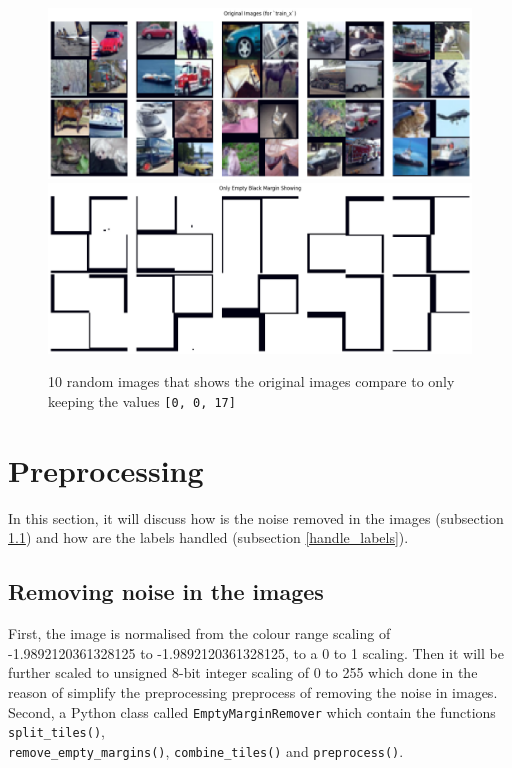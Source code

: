 \documentclass{article}
\begin{document}
\begin{figure}[H]
    \centering
    \includegraphics[width=0.7\linewidth]{images/org_img_before_detect_margin.png}
    \includegraphics[width=0.7\linewidth]{images/margin_detected.png}
    \caption{10 random images that shows the original images compare to only keeping the values \texttt{[0, 0, 17]}}
    \label{fig:margin_detected}
\end{figure}

\section{Preprocessing} \label{preprocessing}

In this section, it will discuss how is the noise removed in the images
(subsection \ref{preprocess_noise}) and how are the labels handled 
(subsection \ref{handle_labels}).

\subsection{Removing noise in the images} \label{preprocess_noise}

First, the image is normalised from the colour range scaling of 
-1.9892120361328125 to -1.9892120361328125, to a 0 to 1 scaling. Then it will 
be further scaled to unsigned 8-bit integer scaling of 0 to 255 which 
done in the reason of simplify the preprocessing preprocess of removing 
the noise in images.\\

Second, a Python class called \texttt{EmptyMarginRemover} which contain
the functions \texttt{split\_tiles()},\\ \texttt{remove\_empty\_margins()},
\texttt{combine\_tiles()} and \texttt{preprocess()}.\\
\end{document}

